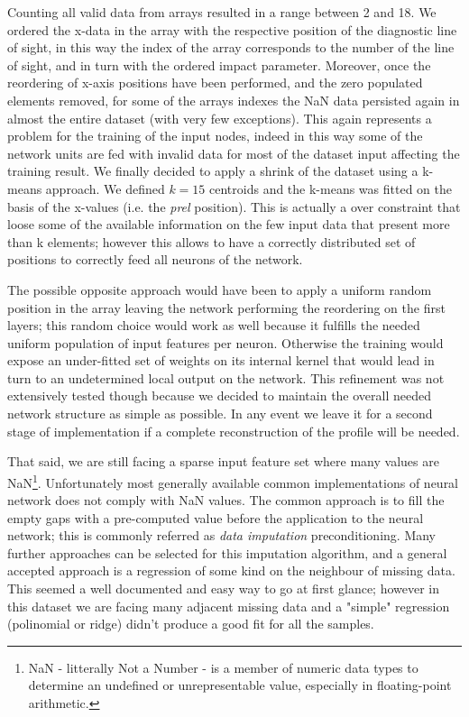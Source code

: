 Counting all valid data from arrays resulted in a range between 2 and 18.
We ordered the x-data in the array with the respective position of the diagnostic line of sight, in this way the index of the array corresponds to the number of the line of sight, and in turn with the ordered impact parameter.
Moreover, once the reordering of x-axis positions have been performed, and the zero populated elements removed, for some of the arrays indexes the NaN data persisted again in almost the entire dataset (with very few exceptions). 
This again represents a problem for the training of the input nodes, indeed in this way some of the network units are fed with invalid data for most of the dataset input affecting the training result.
We finally decided to apply a shrink of the dataset using a k-means approach. We defined $k=15$ centroids and the k-means was fitted on the basis of the x-values (i.e. the \textit{prel} position). This is actually a over constraint that loose some of the available information on the few input data that present more than k elements; however this allows to have a correctly distributed set of positions to correctly feed all neurons of the network.

The possible opposite approach would have been to apply a uniform random position in the array leaving the network performing the reordering on the first layers; this random choice would work as well because it fulfills the needed uniform population of input features per neuron. Otherwise the training would expose an under-fitted set of weights on its internal kernel that would lead in turn to an undetermined local output on the network.
This refinement was not extensively tested though because we decided to maintain the overall needed network structure as simple as possible. In any event we leave it for a second stage of implementation if a complete reconstruction of the profile will be needed.

That said, we are still facing a sparse input feature set where many values are NaN\footnote{NaN - litterally Not a Number - is a member of numeric data types to determine an undefined or unrepresentable value, especially in floating-point arithmetic. }. Unfortunately most generally available common implementations of neural network does not comply with NaN values. The common approach is to fill the empty gaps with a pre-computed value before the application to the neural network; this is commonly referred as \textit{data imputation} preconditioning. Many further approaches can be selected for this imputation algorithm, and a general accepted approach is a regression of some kind on the neighbour of missing data. This seemed a well documented and easy way to go at first glance; however in this dataset we are facing many adjacent missing data and a "simple" regression (polinomial or ridge) didn't produce a good fit for all the samples. 

